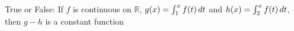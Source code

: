 \documentclass{ximera}
\author{Steven Gubkin}
\begin{document}
\begin{exercise}

True or False:  If  $f$ is continuous on $\mathbb{R}$,  $g(x)= \int_1^{x} f(t) \mathop{}\!d t$ and  $h(x)= \int_2^x f(t) \mathop{}\!d t$, then $g-h$ is a constant function


\begin{prompt}
	\begin{multipleChoice}
	\end{multipleChoice}
\end{prompt}

\end{exercise}
\end{document}
